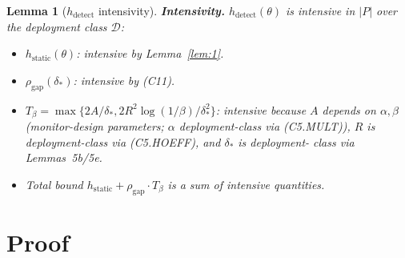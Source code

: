 \documentclass{article}
\newtheorem{lemma}{Lemma}
\newcommand{\deltastar}{\delta_{*}}
\newcommand{\rhogap}{\rho_{\mathrm{gap}}}
\newcommand{\Tbeta}{T_{\beta}}
\begin{document}
\begin{lemma}[$h_{\mathrm{detect}}$ intensivity]
\textbf{Intensivity.}  $h_{\mathrm{detect}}(\theta)$ is intensive
in $|P|$ over the deployment class $\mathcal{D}$:
\begin{itemize}
\item $h_{\mathrm{static}}(\theta)$: intensive by Lemma~\ref{lem:1}.
\item $\rhogap(\deltastar)$: intensive by (C11).
\item $\Tbeta = \max\{2A/\deltastar, 2R^2\log(1/\beta)/\deltastar^2\}$:
  intensive because $A$ depends on $\alpha, \beta$ (monitor-design
  parameters; $\alpha$ deployment-class via (C5.MULT)), $R$ is
  deployment-class via (C5.HOEFF), and $\deltastar$ is deployment-
  class via Lemmas~5b/5e.
\item Total bound $h_{\mathrm{static}} + \rhogap \cdot \Tbeta$ is
  a sum of intensive quantities.
\end{itemize}
\end{lemma}

\section{Proof}
\end{document}
